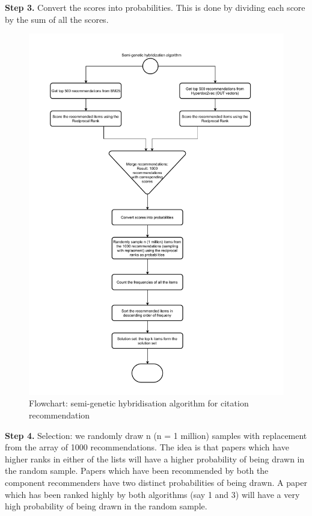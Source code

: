 \textbf{Step 3.} Convert the scores into probabilities. This is done by dividing each score by the sum of all the scores.
\begin{figure}
 \includegraphics[keepaspectratio, width=14cm]{figures/Approach/Hybridflowchart.pdf}
  \caption{Flowchart: semi-genetic hybridisation algorithm for citation recommendation}
  \label{fig:hybridflowchart}
\end{figure}

\textbf{Step 4.} Selection: we randomly draw n (n = 1 million) samples with replacement from the array of 1000 recommendations. The idea is that papers which have higher ranks in either of the lists will have a higher probability of being drawn in the random sample. Papers which have been recommended by both the component recommenders have two distinct probabilities of being drawn. A paper which has been ranked highly by both algorithms (say 1 and 3) will have a very high probability of being drawn in the random sample.

